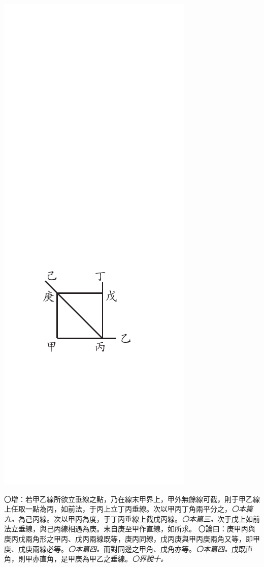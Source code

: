 \documentclass[12pt,b5paper,landscape]{article}
\newcommand{\ccom}[1]{{\footnotesize \emph{〇#1}}}
\newcommand{\bcom}[1]{〇#1}
\begin{document}
\begin{multicols}{2}
\begin{center}
\includegraphics[angle=90]{eu53}
\end{center}
\bcom{增：若甲乙線所欲立垂線之點，乃在線末甲界上，甲外無餘線可截，則于甲乙線上任取一點為丙，如前法，于丙上立丁丙垂線。次以甲丙丁角兩平分之，\ccom{本篇九。}為己丙線。次以甲丙為度，于丁丙垂線上截戊丙線。\ccom{本篇三。}次于戊上如前法立垂線，與己丙線相遇為庚。末自庚至甲作直線，如所求。}
\bcom{論曰：庚甲丙與庚丙戊兩角形之甲丙、戊丙兩線既等，庚丙同線，戊丙庚與甲丙庚兩角又等，即甲庚、戊庚兩線必等。\ccom{本篇四。}而對同邊之甲角、戊角亦等。\ccom{本篇四。}戊既直角，則甲亦直角，是甲庚為甲乙之垂線。\ccom{界說十。}}

\end{multicols}
\end{document}
